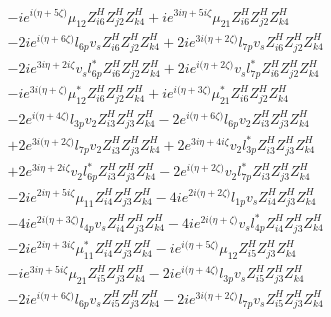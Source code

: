 \begin{align}
 &-i e^{i \Big(\eta +5 \zeta \Big)} \mu_{12} Z_{{i 6}}^{H} Z_{{j 2}}^{H} Z_{{k 4}}^{H} +i e^{3 i \eta +5 i \zeta } \mu_{21} Z_{{i 6}}^{H} Z_{{j 2}}^{H} Z_{{k 4}}^{H} \nonumber \\ 
 &-2 i e^{i \Big(\eta +6 \zeta \Big)} l_{6p} v_s Z_{{i 6}}^{H} Z_{{j 2}}^{H} Z_{{k 4}}^{H} +2 i e^{3 i \Big(\eta +2 \zeta \Big)} l_{7p} v_s Z_{{i 6}}^{H} Z_{{j 2}}^{H} Z_{{k 4}}^{H} \nonumber \\ 
 &-2 i e^{3 i \eta +2 i \zeta } v_s l_{6p}^* Z_{{i 6}}^{H} Z_{{j 2}}^{H} Z_{{k 4}}^{H} +2 i e^{i \Big(\eta +2 \zeta \Big)} v_s l_{7p}^* Z_{{i 6}}^{H} Z_{{j 2}}^{H} Z_{{k 4}}^{H} \nonumber \\ 
 &-i e^{3 i \Big(\eta +\zeta \Big)} \mu_{12}^* Z_{{i 6}}^{H} Z_{{j 2}}^{H} Z_{{k 4}}^{H} +i e^{i \Big(\eta +3 \zeta \Big)} \mu_{21}^* Z_{{i 6}}^{H} Z_{{j 2}}^{H} Z_{{k 4}}^{H} \nonumber \\ 
 &-2 e^{i \Big(\eta +4 \zeta \Big)} l_{3p} v_2 Z_{{i 3}}^{H} Z_{{j 3}}^{H} Z_{{k 4}}^{H} -2 e^{i \Big(\eta +6 \zeta \Big)} l_{6p} v_2 Z_{{i 3}}^{H} Z_{{j 3}}^{H} Z_{{k 4}}^{H} \nonumber \\ 
 &+2 e^{3 i \Big(\eta +2 \zeta \Big)} l_{7p} v_2 Z_{{i 3}}^{H} Z_{{j 3}}^{H} Z_{{k 4}}^{H} +2 e^{3 i \eta +4 i \zeta } v_2 l_{3p}^* Z_{{i 3}}^{H} Z_{{j 3}}^{H} Z_{{k 4}}^{H} \nonumber \\ 
 &+2 e^{3 i \eta +2 i \zeta } v_2 l_{6p}^* Z_{{i 3}}^{H} Z_{{j 3}}^{H} Z_{{k 4}}^{H} -2 e^{i \Big(\eta +2 \zeta \Big)} v_2 l_{7p}^* Z_{{i 3}}^{H} Z_{{j 3}}^{H} Z_{{k 4}}^{H} \nonumber \\ 
 &-2 i e^{2 i \eta +5 i \zeta } \mu_{11} Z_{{i 4}}^{H} Z_{{j 3}}^{H} Z_{{k 4}}^{H} -4 i e^{2 i \Big(\eta +2 \zeta \Big)} l_{1p} v_s Z_{{i 4}}^{H} Z_{{j 3}}^{H} Z_{{k 4}}^{H} \nonumber \\ 
 &-4 i e^{2 i \Big(\eta +3 \zeta \Big)} l_{4p} v_s Z_{{i 4}}^{H} Z_{{j 3}}^{H} Z_{{k 4}}^{H} -4 i e^{2 i \Big(\eta +\zeta \Big)} v_s l_{4p}^* Z_{{i 4}}^{H} Z_{{j 3}}^{H} Z_{{k 4}}^{H} \nonumber \\ 
 &-2 i e^{2 i \eta +3 i \zeta } \mu_{11}^* Z_{{i 4}}^{H} Z_{{j 3}}^{H} Z_{{k 4}}^{H} -i e^{i \Big(\eta +5 \zeta \Big)} \mu_{12} Z_{{i 5}}^{H} Z_{{j 3}}^{H} Z_{{k 4}}^{H} \nonumber \\ 
 &-i e^{3 i \eta +5 i \zeta } \mu_{21} Z_{{i 5}}^{H} Z_{{j 3}}^{H} Z_{{k 4}}^{H} -2 i e^{i \Big(\eta +4 \zeta \Big)} l_{3p} v_s Z_{{i 5}}^{H} Z_{{j 3}}^{H} Z_{{k 4}}^{H} \nonumber \\ 
 &-2 i e^{i \Big(\eta +6 \zeta \Big)} l_{6p} v_s Z_{{i 5}}^{H} Z_{{j 3}}^{H} Z_{{k 4}}^{H} -2 i e^{3 i \Big(\eta +2 \zeta \Big)} l_{7p} v_s Z_{{i 5}}^{H} Z_{{j 3}}^{H} Z_{{k 4}}^{H} \nonumber \\ 

\end{align}
